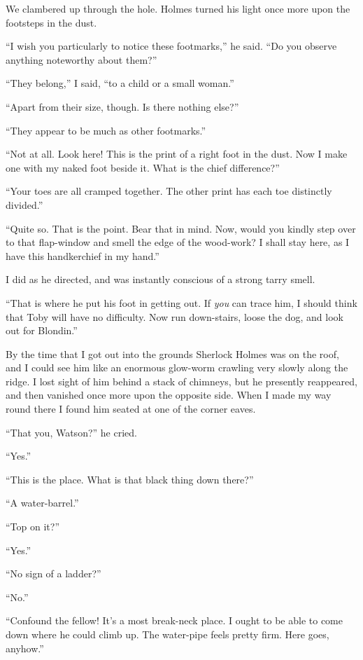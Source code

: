 \documentclass[12pt,english,oneside]{book}
\begin{document}
We clambered up through the hole. Holmes turned his light once more
upon the footsteps in the dust.

{}``I wish you particularly to notice these footmarks,'' he said.
{}``Do you observe anything noteworthy about them?''

{}``They belong,'' I said, {}``to a child or a small woman.''

{}``Apart from their size, though. Is there nothing else?''

{}``They appear to be much as other footmarks.''

{}``Not at all. Look here! This is the print of a right foot in the
dust. Now I make one with my naked foot beside it. What is the chief
difference?''

{}``Your toes are all cramped together. The other print has each
toe distinctly divided.''

{}``Quite so. That is the point. Bear that in mind. Now, would you
kindly step over to that flap-window and smell the edge of the wood-work?
I shall stay here, as I have this handkerchief in my hand.''

I did as he directed, and was instantly conscious of a strong tarry
smell.

{}``That is where he put his foot in getting out. If \textit{you}
can trace him, I should think that Toby will have no difficulty. Now
run down-stairs, loose the dog, and look out for Blondin.''

By the time that I got out into the grounds Sherlock Holmes was on
the roof, and I could see him like an enormous glow-worm crawling
very slowly along the ridge. I lost sight of him behind a stack of
chimneys, but he presently reappeared, and then vanished once more
upon the opposite side. When I made my way round there I found him
seated at one of the corner eaves.

{}``That you, Watson?'' he cried.

{}``Yes.''

{}``This is the place. What is that black thing down there?''

{}``A water-barrel.''

{}``Top on it?''

{}``Yes.''

{}``No sign of a ladder?''

{}``No.''

{}``Confound the fellow! It's a most break-neck place. I ought to
be able to come down where he could climb up. The water-pipe feels
pretty firm. Here goes, anyhow.''
\end{document}
